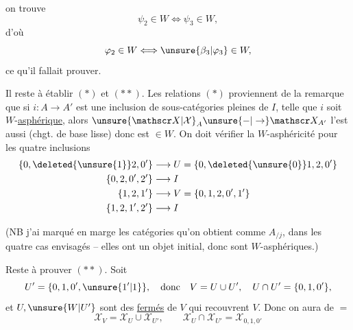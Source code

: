
on trouve
\[
 \psi_2\in W\Longleftrightarrow\psi_3\in W,
\]
d'où
\[
 \varphi_2\in W\Longleftrightarrow\unsure{\beta_3|\varphi_3}\in W,
\]
ce qu'il fallait prouver.

Il reste à établir $(*)$ et $(**)$. Les relations $(*)$ proviennent de la remarque que si $i:A\longrightarrow A'$ est une inclusion de sous-catégories pleines de $I$, telle que $i$ soit $W$-\uline{asphérique},  alors $\unsure{\mathscr X|\mathcal X}_A\unsure{-|\to}\mathscr X_{A'}$ l'est aussi (chgt. de base lisse) donc est $\in W$. On doit vérifier la $W$-asphéricité pour les quatre inclusions
\[
 \begin{aligned}
 \{0,\deleted{\unsure{1}}2,0'\}&\longrightarrow U=\{0,\deleted{\unsure{0}}1,2,0'\}\\
 \{0,2,0',2'\}&\longrightarrow I\\
 \{1,2,1'\}&\longrightarrow V=\{0,1,2,0',1'\}\\
 \{1,2,1',2'\}&\longrightarrow I
 \end{aligned}
\]

(NB j'ai marqué en marge les catégories qu'on obtient comme $A_{/j}$,  dans les quatre cas envisagés -- elles ont  un objet initial, donc sont $W$-asphériques.)

Reste à prouver $(**)$. Soit
\[
 U'=\{0,1,0',\unsure{1'|1}\},\quad\text{donc}\quad
 V=U\cup U',\quad U\cap U'=\{0,1,0'\},
\]
 et $U,\unsure{W|U'}$ sont des \uline{fermés} de $V$ qui recouvrent $V$. Donc on aura de $=$
\[
 \mathscr X_V=\mathscr X_U\cup\mathscr X_{U'},\qquad
 \mathscr X_U\cap\mathscr X_{U'}=\mathscr X_{0,1,0'}
\]

